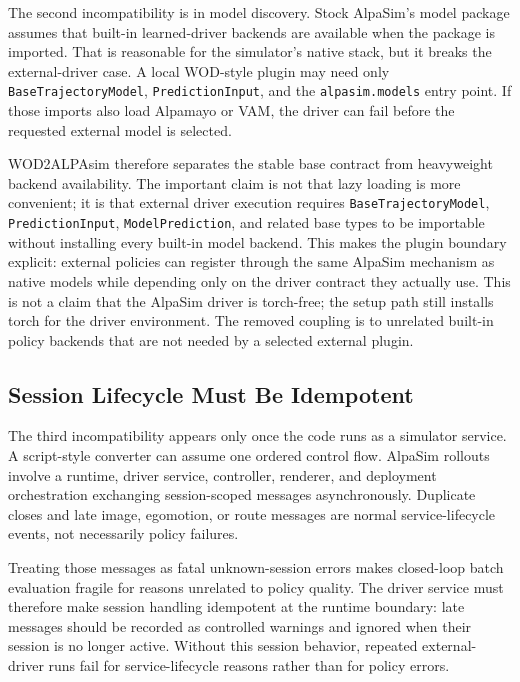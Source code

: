 \documentclass{article}
\begin{document}
The second incompatibility is in model discovery. Stock AlpaSim's model package assumes
that built-in learned-driver backends are available when the package is imported. That is
reasonable for the simulator's native stack, but it breaks the external-driver case. A
local WOD-style plugin may need only \texttt{BaseTrajectoryModel}, \texttt{PredictionInput},
and the \texttt{alpasim.models} entry point. If those imports also load Alpamayo or VAM,
the driver can fail before the requested external model is selected.

WOD2ALPAsim therefore separates the stable base contract from heavyweight backend
availability. The important claim is not that lazy loading is more convenient; it is that
external driver execution requires \texttt{BaseTrajectoryModel},
\texttt{PredictionInput}, \texttt{ModelPrediction}, and related base types to be
importable without installing every built-in model backend. This makes the plugin
boundary explicit: external policies can register through the same AlpaSim mechanism as
native models while depending only on the driver contract they actually use.
This is not a claim that the AlpaSim driver is torch-free; the setup path still installs
torch for the driver environment. The removed coupling is to unrelated built-in policy
backends that are not needed by a selected external plugin.

\subsection{Session Lifecycle Must Be Idempotent}

The third incompatibility appears only once the code runs as a simulator service. A
script-style converter can assume one ordered control flow. AlpaSim rollouts involve a
runtime, driver service, controller, renderer, and deployment orchestration exchanging
session-scoped messages asynchronously. Duplicate closes and late image, egomotion, or
route messages are normal service-lifecycle events, not necessarily policy failures.

Treating those messages as fatal unknown-session errors makes closed-loop batch
evaluation fragile for reasons unrelated to policy quality. The driver service must
therefore make session handling idempotent at the runtime boundary: late messages should
be recorded as controlled warnings and ignored when their session is no longer active.
Without this session behavior, repeated external-driver runs fail for service-lifecycle
reasons rather than for policy errors.
\end{document}
